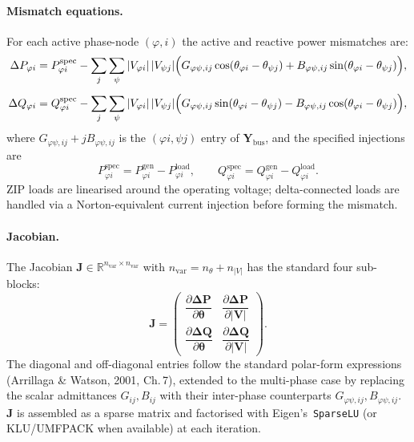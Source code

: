 \paragraph{Mismatch equations.}
For each active phase-node $(\varphi, i)$ the active and reactive power
mismatches are:
\begin{align}
  \Delta P_{\varphi i} &= P^{\text{spec}}_{\varphi i}
    - \sum_{j}\sum_{\psi}
      |V_{\varphi i}|\,|V_{\psi j}|
      \Bigl(
        G_{\varphi\psi,ij}\cos(\theta_{\varphi i}-\theta_{\psi j})
       +B_{\varphi\psi,ij}\sin(\theta_{\varphi i}-\theta_{\psi j})
      \Bigr),
  \label{eq:3ph-p-mismatch}\\[4pt]
  \Delta Q_{\varphi i} &= Q^{\text{spec}}_{\varphi i}
    - \sum_{j}\sum_{\psi}
      |V_{\varphi i}|\,|V_{\psi j}|
      \Bigl(
        G_{\varphi\psi,ij}\sin(\theta_{\varphi i}-\theta_{\psi j})
       -B_{\varphi\psi,ij}\cos(\theta_{\varphi i}-\theta_{\psi j})
      \Bigr),
  \label{eq:3ph-q-mismatch}
\end{align}
where $G_{\varphi\psi,ij}+jB_{\varphi\psi,ij}$ is the
$(\varphi i,\psi j)$ entry of $\mathbf{Y}_{\text{bus}}$, and the
specified injections are
\[
  P^{\text{spec}}_{\varphi i} =
    P^{\text{gen}}_{\varphi i} - P^{\text{load}}_{\varphi i}, \qquad
  Q^{\text{spec}}_{\varphi i} =
    Q^{\text{gen}}_{\varphi i} - Q^{\text{load}}_{\varphi i}.
\]
ZIP loads are linearised around the operating voltage; delta-connected
loads are handled via a Norton-equivalent current injection before
forming the mismatch.

\paragraph{Jacobian.}
The Jacobian $\mathbf{J} \in \mathbb{R}^{n_\text{var} \times n_\text{var}}$
with $n_\text{var} = n_{\theta} + n_{|V|}$ has the standard four sub-blocks:
\[
  \mathbf{J} =
  \begin{pmatrix}
    \dfrac{\partial\boldsymbol{\Delta P}}{\partial\boldsymbol{\theta}} &
    \dfrac{\partial\boldsymbol{\Delta P}}{\partial|\mathbf{V}|} \\[8pt]
    \dfrac{\partial\boldsymbol{\Delta Q}}{\partial\boldsymbol{\theta}} &
    \dfrac{\partial\boldsymbol{\Delta Q}}{\partial|\mathbf{V}|}
  \end{pmatrix}.
\]
The diagonal and off-diagonal entries follow the standard polar-form
expressions (Arrillaga \& Watson, 2001, Ch.\,7), extended to the
multi-phase case by replacing the scalar admittances
$G_{ij}, B_{ij}$ with their inter-phase counterparts
$G_{\varphi\psi,ij}, B_{\varphi\psi,ij}$.
$\mathbf{J}$ is assembled as a sparse matrix and factorised with
Eigen's~\texttt{SparseLU} (or KLU/UMFPACK when available) at each
iteration.

